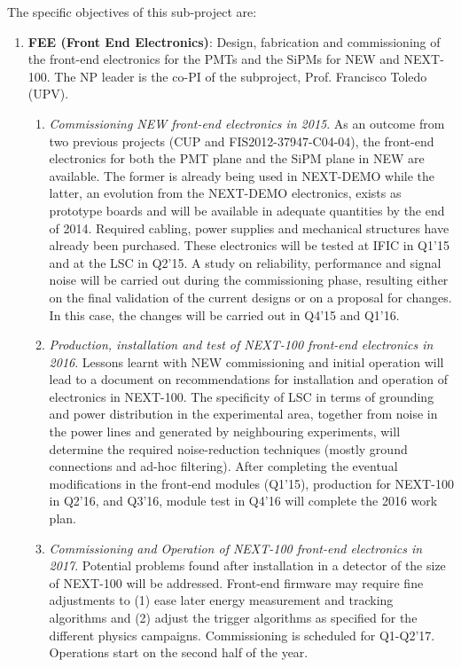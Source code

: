 The specific objectives of this sub-project are:

\begin{enumerate}

\item {\bf FEE (Front End Electronics)}: Design, fabrication and commissioning of the front-end electronics for the PMTs and the SiPMs for NEW and NEXT-100. The NP leader is the co-PI of the subproject, Prof. Francisco Toledo (UPV).
\begin{enumerate}
\item	{\em Commissioning NEW front-end electronics in 2015}. As an outcome from two previous projects (CUP and FIS2012-37947-C04-04), the front-end electronics for both the PMT plane and the SiPM plane in NEW are available. The former is already being used in NEXT-DEMO while the latter, an evolution from the NEXT-DEMO electronics, exists as prototype boards and will be available in adequate quantities by the end of 2014. Required cabling, power supplies and mechanical structures have already been purchased.
These electronics will be tested at IFIC in Q1’15 and at the LSC in Q2’15. A study on reliability, performance and signal noise will be carried out during the commissioning phase, resulting either on the final validation of the current designs or on a proposal for changes. In this case, the changes will be carried out in Q4’15 and Q1’16.

\item {\em Production, installation and test of NEXT-100 front-end electronics in 2016}. Lessons learnt with NEW commissioning and initial operation will lead to a document on recommendations for installation and operation of electronics in NEXT-100. The specificity of LSC in terms of grounding and power distribution in the experimental area, together from noise in the power lines and generated by neighbouring experiments, will determine the required noise-reduction techniques (mostly ground connections and ad-hoc filtering). After completing the eventual modifications in the front-end modules (Q1'15), production for NEXT-100 in Q2’16, and Q3'16, module test in Q4’16 will complete the 2016 work plan.

\item {\em Commissioning and Operation of NEXT-100 front-end electronics in 2017}. Potential problems found after installation in a detector of the size of NEXT-100 will be addressed. Front-end firmware may require fine adjustments to (1) ease later energy measurement and tracking algorithms and (2) adjust the trigger algorithms as specified for the different physics campaigns. Commissioning is scheduled for Q1-Q2’17. Operations start on the second half of the year.
\end{enumerate}
 

\end{enumerate}

